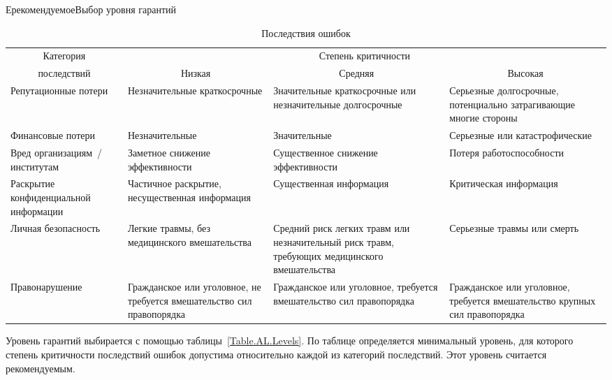 \begin{appendix}{Е}{рекомендуемое}{Выбор уровня гарантий}
\begin{table}[hbt]
\caption{Последствия ошибок}\label{Table.AL.Impact}
{\small
\begin{tabular}{|p{3.3cm}|p{4cm}|p{4cm}|p{4cm}|}
\hline
\multicolumn{1}{|c|}{Категория} & \multicolumn{3}{c|}{Степень критичности}\\
\cline{2-4}
\multicolumn{1}{|c|}{последствий} & \multicolumn{1}{c|}{Низкая} 
& \multicolumn{1}{c|}{Средняя} 
& \multicolumn{1}{c|}{Высокая}\\
\hline
\hline
Репутационные потери & 
Незначительные краткосрочные & 
Значительные краткосрочные или незначительные долгосрочные &  
Серьезные долгосрочные, потенциально затрагивающие многие стороны\\
%
\hline
Финансовые потери & 
Незначительные &
Значительные &
Серьезные или катастрофические\\
%
\hline
Вред организациям~/ институтам & 
Заметное снижение эффективности & 
Существенное снижение эффективности & 
Потеря работоспособности\\ 
%
\hline
Раскрытие конфиденциальной информации &
Частичное раскрытие, несущественная информация &
Существенная информация &
Критическая информация\\
%
\hline
Личная безопасность &
Легкие травмы, без медицинского вмешательства &
Средний риск легких травм или незначительный риск травм, требующих 
медицинского вмешательства &
Серьезные травмы или смерть\\
%
\hline
Правонарушение & 
Гражданское или уголовное, не требуется вмешательство сил правопорядка &
Гражданское или уголовное, требуется вмешательство сил правопорядка &
Гражданское или уголовное, требуется вмешательство крупных сил правопорядка\\
\hline
\end{tabular}
}
\end{table}

\label{AL.Levels}

Уровень гарантий выбирается с помощью таблицы~\ref{Table.AL.Levels}.
%
По таблице определяется минимальный уровень, для которого степень критичности
последствий ошибок допустима относительно каждой из категорий последствий.
%
Этот уровень считается рекомендуемым. 


\end{appendix}
